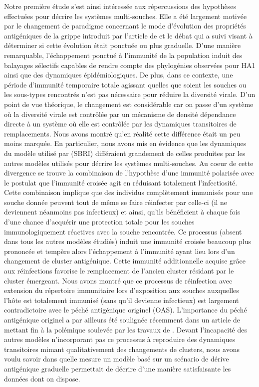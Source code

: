 Notre première étude s'est ainsi intéressée aux répercussions des
hypothèses effectuées pour décrire les systèmes multi-souches. Elle a
été largement motivée par le changement de paradigme concernant le
mode d'évolution des propriétés antigéniques de la grippe introduit
par l'article de \citet{Koelle2006} et le débat qui a suivi visant à
déterminer si cette évolution était ponctuée ou plus graduelle. D'une
manière remarquable, l'échappement ponctué à l'immunité de la
population induit des balayages sélectifs capables de rendre compte
des phylogénies observées pour HA1 ainsi que des dynamiques
épidémiologiques. De plus, dans ce contexte, une période d'immunité
temporaire totale agissant quelles que soient les souches ou les
sous-types rencontrés n'est pas nécessaire pour réduire la diversité
virale. D'un point de vue théorique, le changement est considérable
car on passe d'un système où la diversité virale est contrôlée par un
mécanisme de densité dépendance directe à un système où elle est
contrôlée par les dynamiques transitoires de remplacements. Nous avons
montré qu'en réalité cette différence était un peu moins marquée. En
particulier, nous avons mis en évidence que les dynamiques du modèle
utilisé par \citet{Koelle2006} (SBRI) différaient grandement de celles
produites par les autres modèles utilisés pour décrire les systèmes
multi-souches. Au coeur de cette divergence se trouve la combinaison
de l'hypothèse d'une immunité polarisée avec le postulat que
l'immunité croisée agit en réduisant totalement l'infectiosité. Cette
combinaison implique que des individus complètement immunisés pour une
souche donnée peuvent tout de même se faire réinfecter par celle-ci
(il ne deviennent néanmoins pas infectieux) et ainsi, qu'ils
bénéficient à chaque fois d'une chance d'acquérir une protection
totale pour les souches immunologiquement réactives avec la souche
rencontrée. Ce processus (absent dans tous les autres modèles étudiés)
induit une immunité croisée beaucoup plus prononcée et tempère alors
l'échappement à l'immunité ayant lieu lors d'un changement de cluster
antigénique. Cette immunité additionnelle acquise grâce aux
réinfections favorise le remplacement de l'ancien cluster résidant par
le cluster émergeant. Nous avons montré que ce processus de
réinfection avec extension du répertoire immunitaire lors d'exposition
aux souches auxquelles l'hôte est totalement immunisé (sans qu'il
devienne infectieux) est largement contradictoire avec le péché
antigénique originel (OAS). L'importance du péché antigénique originel
a par ailleurs été soulignée récemment dans un article de
\citet{Kim2009} mettant fin à la polémique soulevée par les travaux de
\citet{Wrammert2008}. Devant l'incapacité des autres modèles
n'incorporant pas ce processus à reproduire des dynamiques
transitoires mimant qualitativement des changements de clusters, nous
avons voulu savoir dans quelle mesure un modèle basé sur un scénario
de dérive antigénique graduelle permettait de décrire d'une manière
satisfaisante les données dont on dispose.

